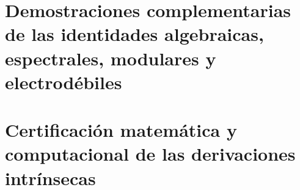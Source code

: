 \chapter{Demostraciones complementarias de las identidades algebraicas, espectrales, modulares y electrodébiles}
\label{hmt:p3:app:demostraciones-complementarias}


\chapter{Certificación matemática y computacional de las derivaciones intrínsecas}
\label{hmt:p3:app:certificacion-constantes}

